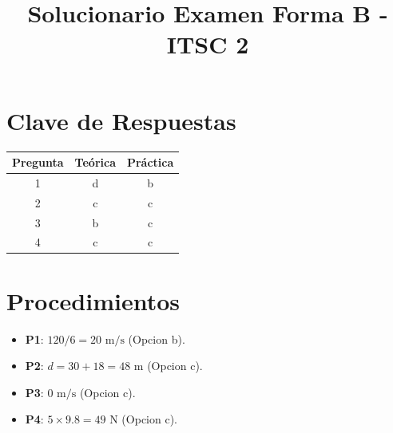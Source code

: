 \documentclass[12pt]{article}
\title{Solucionario Examen Forma B - ITSC 2}
\date{}
\begin{document}
\maketitle

\section*{Clave de Respuestas}

\begin{table}[h]
\centering
\begin{tabular}{|c|c|c|}
\hline
\textbf{Pregunta} & \textbf{Teórica} & \textbf{Práctica} \\ \hline
1 & d & b \\ \hline
2 & c & c \\ \hline
3 & b & c \\ \hline
4 & c & c \\ \hline
\end{tabular}
\end{table}

\section*{Procedimientos}

\begin{itemize}
    \item \textbf{P1}: $120 / 6 = 20 \text{ m/s}$ (Opcion b).
    \item \textbf{P2}: $d = 30 + 18 = 48 \text{ m}$ (Opcion c).
    \item \textbf{P3}: $0 \text{ m/s}$ (Opcion c).
    \item \textbf{P4}: $5 \times 9.8 = 49 \text{ N}$ (Opcion c).
\end{itemize}
\end{document}
